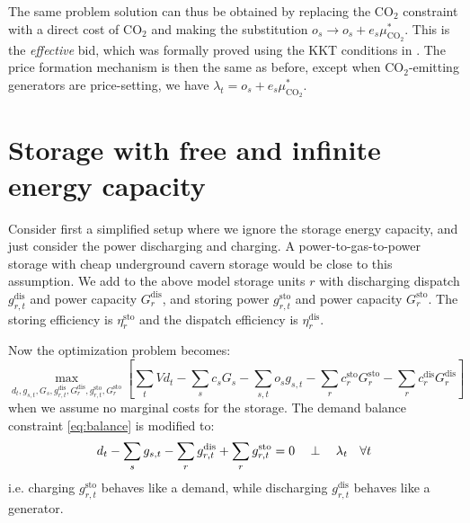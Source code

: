 \documentclass[final,3p]{elsarticle}
\def\l{\lambda} \def\K{\kappa} \def\m{\mu} \def\G{\Gamma} \def\d{\partial}
\begin{document}
The same problem solution can thus be obtained by replacing the CO$_2$
constraint with a direct cost of CO$_2$ and making the substitution $o_s \to o_s
+ e_s \mu^*_{\textrm{CO}_2}$. This is the \textit{effective} bid, which was
formally proved using the KKT conditions in \cite{Brown2020}. The price
formation mechanism is then the same as before, except when CO$_2$-emitting
generators are price-setting, we have $\l_t = o_s + e_s \mu^*_{\textrm{CO}_2}$.

\section*{Storage with free and infinite energy capacity}\label{sec:simple}

Consider first a simplified setup where we ignore the storage energy capacity,
and just consider the power discharging and charging. A power-to-gas-to-power
storage with cheap underground cavern storage would be close to this assumption.
We add to the above model storage units $r$ with discharging dispatch
$g^{\textrm{dis}}_{r,t}$ and power capacity $G^{\textrm{dis}}_{r}$, and storing
power $g^{\textrm{sto}}_{r,t}$ and power capacity $G^{\textrm{sto}}_{r}$. The
storing efficiency is $\eta_r^{\textrm{sto}}$ and the dispatch efficiency is
$\eta_r^{\textrm{dis}}$.

Now the optimization problem becomes:
\begin{equation}
  \max_{d_{t}, g_{s,t}, G_s,g^{\textrm{dis}}_{r,t},G^{\textrm{dis}}_{r},g^{\textrm{sto}}_{r,t},G^{\textrm{sto}}_{r}}\left[\sum_{t} Vd_{t} -  \sum_s c_s G_s - \sum_{s,t} o_{s} g_{s,t} -\sum_r c^{\textrm{sto}}_r G^{\textrm{sto}}_r -\sum_r c^{\textrm{dis}}_r G^{\textrm{dis}}_r\right]  \label{eq:objsr}
\end{equation}
when we assume no marginal costs for the storage. The demand balance constraint \eqref{eq:balance} is modified to:
\begin{align}
  d_{t} - \sum_s g_{s,t} - \sum_r g^{\textrm{dis}}_{r,t} + \sum_r g^{\textrm{sto}}_{r,t}  =  0 \hspace{0.34cm}\perp \hspace{0.34cm} \l_t \hspace{0.34cm} \forall t \label{eq:balance3}
\end{align}
i.e. charging $g^{\textrm{sto}}_{r,t}$ behaves like a demand, while discharging
$g^{\textrm{dis}}_{r,t}$ behaves like a generator.
\end{document}
